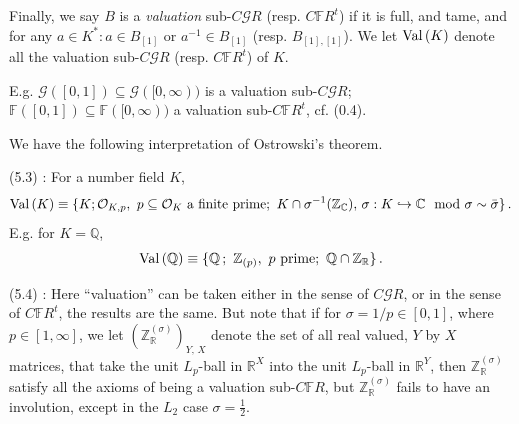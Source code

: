 \documentclass[leqno]{article}
\numberwithin{equation}{section}
\begin{document}
Finally, we say $B$ is a {\it valuation} sub-$C{\mathcal G} R$ (resp. $C{\mathbb F} R^t$) if it is full, and tame, and for any $a \in K^* : a \in B_{[1]}$ or $a^{-1} \in B_{[1]}$ (resp. $B_{[1],[1]}$). We let ${\rm Val} \, (K)$ denote all the valuation sub-$C{\mathcal G} R$ (resp. $C{\mathbb F} R^t$) of $K$. 

\smallskip

E.g. ${\mathcal G} ([0,1]) \subseteq {\mathcal G} ([0,\infty))$ is a valuation sub-$C{\mathcal G} R$; ${\mathbb F} ([0,1]) \subseteq {\mathbb F} ([0,\infty))$ a valuation sub-$C{\mathbb F} R^t$, cf. (0.4). 

\smallskip

We have the following interpretation of Ostrowski's theorem.

\bigskip

\noindent (5.3) : For a number field $K$,
$$
{\rm Val} \, (K) \equiv \{ K ; {\mathcal O}_{K,p} , \ p \subseteq {\mathcal O}_K \ \mbox{a finite prime}; \ K \cap \sigma^{-1} ({\mathbb Z}_{\mathbb C}) , \, \sigma : K \hookrightarrow {\mathbb C} \mod \sigma \sim \bar\sigma \} \, .
$$
E.g. for $K = {\mathbb Q}$,
$$
{\rm Val} \, ({\mathbb Q}) \equiv \{{\mathbb Q} \, ; \ {\mathbb Z}_{(p)} , \ p \ {\rm prime} ; \ {\mathbb Q} \cap {\mathbb Z}_{\mathbb R} \} \, .
$$

\bigskip

\noindent (5.4) : Here ``valuation'' can be taken either in the sense of $C{\mathcal G} R$, or in the sense of $C{\mathbb F} R^t$, the results are the same. But note that if for $\sigma = 1/p \in [0,1]$, where $p \in [1,\infty]$, we let $({\mathbb Z}_{\mathbb R}^{(\sigma)})_{Y, \, X}$ denote the set of all real valued, $Y$ by $X$ matrices, that take the unit $L_p$-ball in ${\mathbb R}^X$ into the unit $L_p$-ball in ${\mathbb R}^Y$, then ${\mathbb Z}_{\mathbb R}^{(\sigma)}$ satisfy all the axioms of being a valuation sub-$C{\mathbb F} R$, but ${\mathbb Z}_{\mathbb R}^{(\sigma)}$ fails to have an involution, except in the $L_2$ case $\sigma = \frac12$.

\smallskip
\end{document}
